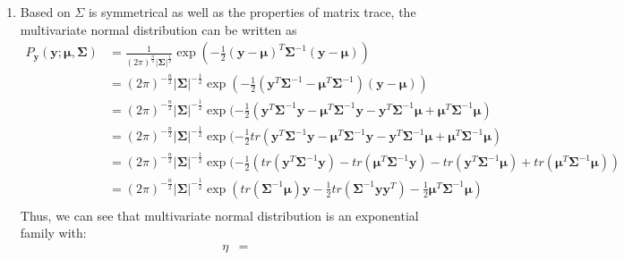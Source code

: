 \documentclass[a4paper]{article}
\begin{document}
\begin{enumerate}
\item Based on $\Sigma$ is symmetrical as well as the properties of matrix trace, the multivariate normal distribution can be written as
\begin{equation*}
  \begin{aligned}
    P_{\boldsymbol y}(\boldsymbol y;\boldsymbol \mu,\boldsymbol \Sigma)
    &= \frac{1}{(2\pi)^{\frac{n}{2}}|\boldsymbol \Sigma|^{\frac{1}{2}}} \exp(-\frac{1}{2}(\boldsymbol{y}-\boldsymbol \mu)^T {\boldsymbol \Sigma}^{-1}(\boldsymbol y-\boldsymbol \mu))\\
    &= (2\pi)^{-\frac{n}{2}}|\boldsymbol \Sigma|^{-\frac{1}{2}} \exp(-\frac{1}{2}(\boldsymbol{y}^T{\boldsymbol \Sigma}^{-1}-\boldsymbol{\mu}^T{\boldsymbol \Sigma}^{-1}) (\boldsymbol{y}-\boldsymbol{\mu}))\\
    &= (2\pi)^{-\frac{n}{2}}|\boldsymbol \Sigma|^{-\frac{1}{2}} \exp(-\frac{1}{2}(\boldsymbol{y}^T{\boldsymbol \Sigma}^{-1} \boldsymbol{y}-\boldsymbol{\mu}^T{\boldsymbol \Sigma}^{-1}\boldsymbol{y} - \boldsymbol{y}^T{\boldsymbol \Sigma}^{-1} \boldsymbol{\mu} + \boldsymbol{\mu}^T{\boldsymbol \Sigma}^{-1}\boldsymbol{\mu})\\
    &= (2\pi)^{-\frac{n}{2}}|\boldsymbol \Sigma|^{-\frac{1}{2}} \exp(-\frac{1}{2} tr(\boldsymbol{y}^T{\boldsymbol \Sigma}^{-1} \boldsymbol{y}-\boldsymbol{\mu}^T{\boldsymbol \Sigma}^{-1}\boldsymbol{y} - \boldsymbol{y}^T{\boldsymbol \Sigma}^{-1} \boldsymbol{\mu} + \boldsymbol{\mu}^T{\boldsymbol \Sigma}^{-1}\boldsymbol{\mu})\\
    &= (2\pi)^{-\frac{n}{2}}|\boldsymbol \Sigma|^{-\frac{1}{2}} \exp(-\frac{1}{2} (tr(\boldsymbol{y}^T{\boldsymbol \Sigma}^{-1} \boldsymbol{y})-tr(\boldsymbol{\mu}^T{\boldsymbol \Sigma}^{-1}\boldsymbol{y}) - tr(\boldsymbol{y}^T{\boldsymbol \Sigma}^{-1} \boldsymbol{\mu}) + tr(\boldsymbol{\mu}^T{\boldsymbol \Sigma}^{-1}\boldsymbol{\mu}))\\
    &= (2\pi)^{-\frac{n}{2}}|\boldsymbol \Sigma|^{-\frac{1}{2}} \exp(tr({\boldsymbol \Sigma}^{-1}\boldsymbol{\mu})\boldsymbol{y} -\frac{1}{2}tr({\boldsymbol \Sigma}^{-1} \boldsymbol{y} \boldsymbol{y}^T)-\frac{1}{2} \boldsymbol{\mu}^T{\boldsymbol \Sigma}^{-1}\boldsymbol{\mu})\\
  \end{aligned}
\end{equation*}
Thus, we can see that multivariate normal distribution is an exponential family with:
\begin{equation*}
  \begin{aligned}
    \eta &= 

\end{aligned}
\end{equation*}
\end{enumerate}
\end{document}
